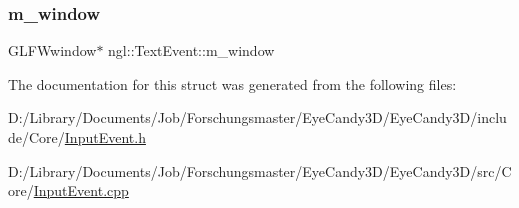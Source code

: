 \mbox{\label{structngl_1_1_text_event_abf9bf7882a1ba397efd151ac9fb48b19}} 
\subsubsection{\texorpdfstring{m\+\_\+window}{m\_window}}
{\footnotesize\ttfamily G\+L\+F\+Wwindow$\ast$ ngl\+::\+Text\+Event\+::m\+\_\+window}



The documentation for this struct was generated from the following files\+:\begin{DoxyCompactItemize}
\item 
D\+:/\+Library/\+Documents/\+Job/\+Forschungsmaster/\+Eye\+Candy3\+D/\+Eye\+Candy3\+D/include/\+Core/\mbox{\hyperlink{_input_event_8h}{Input\+Event.\+h}}\item 
D\+:/\+Library/\+Documents/\+Job/\+Forschungsmaster/\+Eye\+Candy3\+D/\+Eye\+Candy3\+D/src/\+Core/\mbox{\hyperlink{_input_event_8cpp}{Input\+Event.\+cpp}}\end{DoxyCompactItemize}
